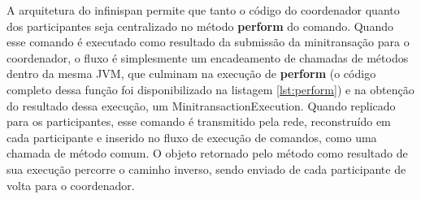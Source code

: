 \documentclass[11pt,twoside,a4paper]{book}
\begin{document}
A arquitetura do infinispan permite que tanto o código do coordenador quanto dos participantes seja centralizado no método \textbf{perform} do comando. Quando esse comando é executado como resultado da submissão da minitransação para o coordenador, o fluxo é simplesmente um encadeamento de chamadas de métodos dentro da mesma JVM, que culminam na execução de \textbf{perform} (o código completo dessa função foi disponibilizado na listagem \ref{lst:perform}) e na obtenção do resultado dessa execução, um MinitransactionExecution. Quando replicado para os participantes, esse comando é transmitido pela rede, reconstruído em cada participante e inserido no fluxo de execução de comandos, como uma chamada de método comum. O objeto retornado pelo método como resultado de sua execução percorre o caminho inverso, sendo enviado de cada participante de volta para o coordenador.
\end{document}
